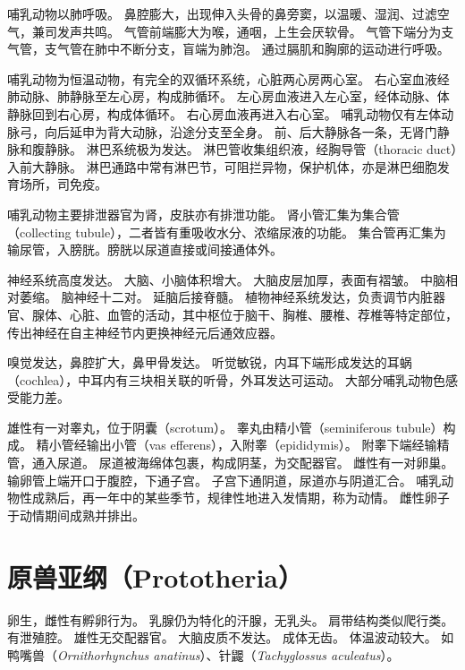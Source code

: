 \documentclass[11pt]{article}
\begin{document}
\newline

哺乳动物以肺呼吸。
鼻腔膨大，出现伸入头骨的鼻旁窦，以温暖、湿润、过滤空气，兼司发声共鸣。
气管前端膨大为喉，通咽，上生会厌软骨。
气管下端分为支气管，支气管在肺中不断分支，盲端为肺泡。
通过膈肌和胸廓的运动进行呼吸。

\newline

哺乳动物为恒温动物，有完全的双循环系统，心脏两心房两心室。
右心室血液经肺动脉、肺静脉至左心房，构成肺循环。
左心房血液进入左心室，经体动脉、体静脉回到右心房，构成体循环。
右心房血液再进入右心室。
哺乳动物仅有左体动脉弓，向后延申为背大动脉，沿途分支至全身。
前、后大静脉各一条，无肾门静脉和腹静脉。
淋巴系统极为发达。
淋巴管收集组织液，经胸导管（thoracic duct）入前大静脉。
淋巴通路中常有淋巴节，可阻拦异物，保护机体，亦是淋巴细胞发育场所，司免疫。

\newline

哺乳动物主要排泄器官为肾，皮肤亦有排泄功能。
肾小管汇集为集合管（collecting tubule），二者皆有重吸收水分、浓缩尿液的功能。
集合管再汇集为输尿管，入膀胱。膀胱以尿道直接或间接通体外。

\newline

神经系统高度发达。
大脑、小脑体积增大。
大脑皮层加厚，表面有褶皱。
中脑相对萎缩。
脑神经十二对。
延脑后接脊髓。
植物神经系统发达，负责调节内脏器官、腺体、心脏、血管的活动，其中枢位于脑干、胸椎、腰椎、荐椎等特定部位，传出神经在自主神经节内更换神经元后通效应器。

\newline

嗅觉发达，鼻腔扩大，鼻甲骨发达。
听觉敏锐，内耳下端形成发达的耳蜗（cochlea），中耳内有三块相关联的听骨，外耳发达可运动。
大部分哺乳动物色感受能力差。

\newline

雄性有一对睾丸，位于阴囊（scrotum）。
睾丸由精小管（seminiferous tubule）构成。
精小管经输出小管（vas efferens），入附睾（epididymis）。
附睾下端经输精管，通入尿道。
尿道被海绵体包裹，构成阴茎，为交配器官。
雌性有一对卵巢。输卵管上端开口于腹腔，下通子宫。
子宫下通阴道，尿道亦与阴道汇合。
哺乳动物性成熟后，再一年中的某些季节，规律性地进入发情期，称为动情。
雌性卵子于动情期间成熟并排出。

\section{原兽亚纲（Prototheria）}
卵生，雌性有孵卵行为。
乳腺仍为特化的汗腺，无乳头。
肩带结构类似爬行类。
有泄殖腔。
雄性无交配器官。
大脑皮质不发达。
成体无齿。
体温波动较大。
如鸭嘴兽（\textit{Ornithorhynchus anatinus}）、针鼹（\textit{Tachyglossus aculeatus}）。
\end{document}
